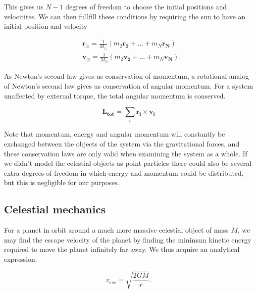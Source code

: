 \documentclass[%
 reprint,
 nobalance,
 amsmath,amssymb,
 aps,
]{revtex4-1}
\begin{document}
This gives us $N-1$ degrees of freedom to choose the initial positions and velocitites. We can then fullfill these conditions by requiring the sun to have an initial position and velocity

\begin{equation}
\begin{split}
	& \bm{r_{\odot}} = \frac{1}{M_{\odot}}(m_2 \bm{r_2} + ... + m_N \bm{r_N}) \\
	& \bm{v_{\odot}} = \frac{1}{M_{\odot}}(m_2 \bm{v_2} + ... + m_N \bm{v_N}).
\end{split}
\end{equation}

As Newton's second law gives us conservation of momentum, a rotational analog of Newton's second law gives us conservation of angular momentum.
For a system unaffected by external torque, the total angular momentum is conserved.

\begin{equation}\label{eq:14}
	\bm{L_{tot}} = \sum_{i}{\bm{r_i} \times \bm{v_i}}
\end{equation}

Note that momentum, energy and angular momentum will constantly be exchanged between the objects of the system via the gravitational forces, and these conservation laws are only valid when examining the system as a whole. If we didn't model the celestial objects as point particles there could also be several extra degrees of freedom in which energy and momentum could be distributed, but this is negligible for our purposes.

\subsection{\label{sec:Cel}Celestial mechanics}
For a planet in orbit around a much more massive celestial object of mass $M$, we may find the escape velocity of the planet by finding the minimum kinetic energy required to move the planet infinitely far away. We thus acquire an analytical expression:

\begin{equation}\label{eq:escape_vel}
	v_{esc} = \sqrt{\frac{2GM}{r}}.
\end{equation}
\end{document}
